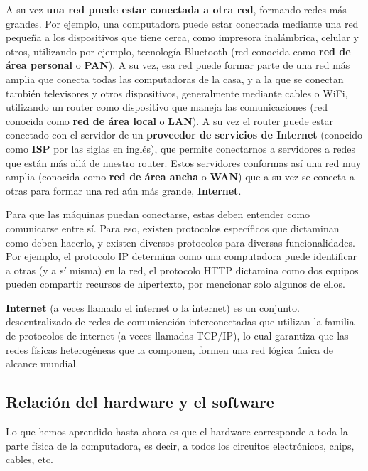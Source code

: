 A su vez \textbf{una red puede estar conectada a otra red}, formando redes más
grandes. Por ejemplo, una computadora puede estar conectada mediante una red
pequeña a los dispositivos que tiene cerca, como impresora inalámbrica, celular
y otros, utilizando por ejemplo, tecnología Bluetooth (red conocida como
\textbf{red de área personal} o \textbf{PAN}). A su vez, esa red puede
formar parte de una red más amplia que conecta todas las computadoras de la
casa, y a la que se conectan también televisores y otros dispositivos,
generalmente mediante cables o WiFi, utilizando un router como dispositivo que
maneja las comunicaciones (red conocida como \textbf{red de área local} o
\textbf{LAN}). A su vez el router puede estar conectado con el servidor de un
\textbf{proveedor de servicios de Internet} (conocido como \textbf{ISP} por
las siglas en inglés), que permite conectarnos a servidores a redes que están
más allá de nuestro router. Estos servidores conformas así una red muy amplia
(conocida como \textbf{red de área ancha} o \textbf{WAN}) que a su vez se
conecta a otras para formar una red aún más grande, \textbf{Internet}.

Para que las máquinas puedan conectarse, estas deben entender como comunicarse
entre sí. Para eso, existen protocolos específicos que dictaminan como deben
hacerlo, y existen diversos protocolos para diversas funcionalidades. Por ejemplo,
el protocolo IP determina como una computadora puede identificar a otras (y a sí
misma) en la red, el protocolo HTTP dictamina como dos equipos pueden compartir
recursos de hipertexto, por mencionar solo algunos de ellos.

\begin{definition}
    \textbf{Internet} (a veces llamado el internet o la internet) es un conjunto.
    descentralizado de redes de comunicación interconectadas que utilizan la
    familia de protocolos de internet (a veces llamadas TCP/IP), lo cual garantiza
    que las redes físicas heterogéneas que la componen, formen una red lógica
    única de alcance mundial.\autocite[vid. p. 256]{downing_2009}
\end{definition}

\subsection{Relación del hardware y el software}

Lo que hemos aprendido hasta ahora es que el hardware corresponde a toda la
parte física de la computadora, es decir, a todos los circuitos electrónicos,
chips, cables, etc.


